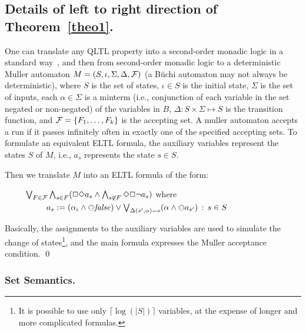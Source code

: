 \documentclass{llncs}
\begin{document}
\subsection*{Details of left to right direction of Theorem~\ref{theo1}.}
One can translate any QLTL property into a second-order monadic logic in a standard
way~\cite{Thomas}, and then from
second-order monadic logic to a deterministic Muller automaton $M = (S, \iota , \Sigma, \Delta, {\cal F})$ (a B\"{u}chi automaton may not always be deterministic), where $S$ is the set of states, $\iota \in S$ is the initial state, $\Sigma$ is the set of inputs, each $\alpha \in \Sigma$ is a minterm (i.e., conjunction of
each variable in the set negated or non-negated) of the variables in $B$, $\Delta : S \times \Sigma \mapsto S$ is the transition function, and ${\cal F} = \{ F_1 , \ldots , F_k \}$ is the accepting set. A muller automaton 
accepts a run if it 
passes infinitely often in exactly
one of the specified accepting sets. To formulate an equivalent ELTL formula,
the auxiliary variables represent the states $S$ of $M$, i.e., $a_s$ represents the state $s \in S$.


\noindent
Then we translate $M$ into an ELTL formula
of the form: 

\begin{tabbing}
\ \ \ \ \ $\bigvee_{F \in {\cal F}} \bigwedge_{s \in F} ( \Box\Diamond a_s \wedge \bigwedge_{s \not\in F} \Diamond \Box \neg a_s)$
where \\
\ \ \ \ \ \ \ \ \ \ $a_s :=   ( \alpha_{\iota} \wedge \ominus \mathit{false} ) \vee \bigvee_{\Delta ( s'
, \alpha ) = s } 
(\alpha \wedge \ominus a_{s'}) 
\, :\,  s \in S$
\end{tabbing}

\noindent
Basically, the assignments to the auxiliary variables are used to simulate the change of states\footnote{It is possible to use only $\lceil \log ( | S | ) \rceil$
variables, at the expense of longer and more complicated formulas.}, and the main formula expresses the Muller acceptance condition. \qed


\subsubsection*{Set Semantics.}
\end{document}
